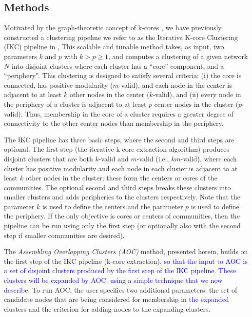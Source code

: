 \documentclass[12pt, oneside]{article}   	%
\begin{document}
\subsection{Methods} Motivated by the graph-theoretic concept of k-cores \citep{Giatsidis2011,malliaros2019}, we have previously constructed a clustering pipeline we refer to as  the Iterative K-core Clustering (IKC) pipeline in \cite{Wedell2022}, This scalable and tunable method takes, as input, two parameters $k$ and $p$ with $k > p \geq 1$, and computes a clustering of a given network $N$ into disjoint clusters where each cluster has a ``core'' component, and a ``periphery". This clustering is designed to satisfy several criteria: (i) the core is connected,  has positive modularity ($m$-valid), and each node in the center  is adjacent to at least $k$ other nodes in the center ($k$-valid), and (ii) every node in the periphery of a cluster is adjacent to at least $p$ center nodes in the cluster ($p$-valid). Thus, membership in the core of a cluster requires a greater degree of connectivity to the other center nodes than membership in the periphery. 
	
The IKC pipeline has three basic steps, where the second and third steps are optional.  The first step (the iterative k-core extraction algorithm) produces disjoint clusters that are both $k$-valid and $m$-valid (i.e.,  $km$-valid), where each cluster has positive modularity and each node in each cluster is adjacent to at least $k$ other nodes in the cluster; these form the centers or cores of the communities. The optional second and third steps breaks these clusters into smaller clusters and adds peripheries to the clusters respectively.  Note that the parameter $k$ is used to define the centers and the parameter $p$ is used to define the periphery. If the only objective is cores or centers of communities, then the pipeline can be run using only the first step (or optionally also with the second step if smaller communities are desired).

	
The \emph{Assembling Overlapping Clusters (AOC)} method, presented herein, builds on the first step of the IKC pipeline (k-core extraction), 
\textcolor{blue}{so that the input to AOC is a set of disjoint clusters produced by the first step of the IKC pipeline. These clusters will be expanded by AOC,  using a simple technique that we now describe.}
To run AOC, the user specifies two additional parameters:  the set of candidate nodes that are being considered for membership in \textcolor{blue}{the expanded} clusters and the criterion for adding nodes to the expanding clusters. 
\end{document}

